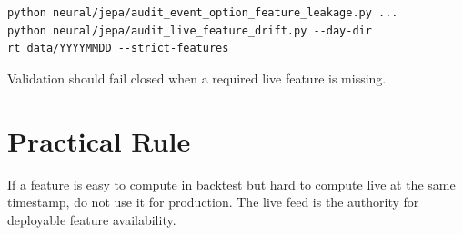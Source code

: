 \documentclass[11pt,a4paper]{article}
\begin{document}
\begin{lstlisting}
python neural/jepa/audit_event_option_feature_leakage.py ...
python neural/jepa/audit_live_feature_drift.py --day-dir rt_data/YYYYMMDD --strict-features
\end{lstlisting}

Validation should fail closed when a required live feature is missing.

\section{Practical Rule}

If a feature is easy to compute in backtest but hard to compute live at the same timestamp, do not use it for production. The live feed is the authority for deployable feature availability.
\end{document}
